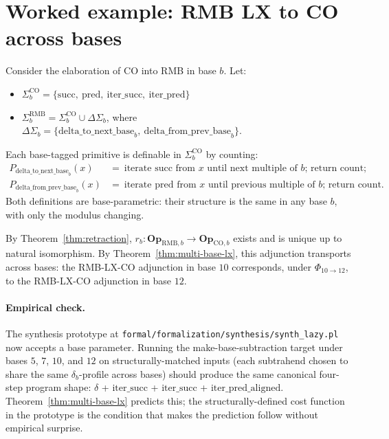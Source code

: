 \documentclass[11pt]{article}
\begin{document}
\section{Worked example: RMB LX to CO across bases}

Consider the elaboration of CO into RMB in base $b$. Let:
\begin{itemize}[noitemsep,topsep=2pt]
  \item $\Sigma^{\mathrm{CO}}_b = \{\mathrm{succ},\
        \mathrm{pred},\ \mathrm{iter\_succ},\ \mathrm{iter\_pred}\}$
  \item $\Sigma^{\mathrm{RMB}}_b = \Sigma^{\mathrm{CO}}_b \cup
        \Delta\Sigma_b$, where
        $\Delta\Sigma_b = \{\mathrm{delta\_to\_next\_base}_b,\
        \mathrm{delta\_from\_prev\_base}_b\}$.
\end{itemize}
Each base-tagged primitive is definable in $\Sigma^{\mathrm{CO}}_b$
by counting:
\begin{align}
P_{\mathrm{delta\_to\_next\_base}_b}(x) &= \ \text{iterate } \mathrm{succ}
  \text{ from } x \text{ until next multiple of } b\text{; return count;} \\
P_{\mathrm{delta\_from\_prev\_base}_b}(x) &= \ \text{iterate }
  \mathrm{pred} \text{ from } x \text{ until previous multiple of }
  b\text{; return count.}
\end{align}
Both definitions are base-parametric: their structure is the same
in any base $b$, with only the modulus changing.

By Theorem~\ref{thm:retraction}, $r_b : \mathbf{Op}_{\mathrm{RMB}, b}
\to \mathbf{Op}_{\mathrm{CO}, b}$ exists and is unique up to natural
isomorphism. By Theorem~\ref{thm:multi-base-lx}, this adjunction
transports across bases: the RMB-LX-CO adjunction in base $10$
corresponds, under $\Phi_{10 \to 12}$, to the RMB-LX-CO adjunction
in base $12$.

\paragraph{Empirical check.} The synthesis prototype at
\texttt{formal/formalization/synthesis/synth\_lazy.pl} now accepts a base
parameter. Running the make-base-subtraction target under bases $5$,
$7$, $10$, and $12$ on structurally-matched inputs (each subtrahend
chosen to share the same $\delta_b$-profile across bases) should
produce the same canonical four-step program shape: $\delta$ +
$\mathrm{iter\_succ}$ + $\mathrm{iter\_succ}$ +
$\mathrm{iter\_pred\_aligned}$. Theorem~\ref{thm:multi-base-lx}
predicts this; the structurally-defined cost function in the
prototype is the condition that makes the prediction follow without
empirical surprise.
\end{document}

